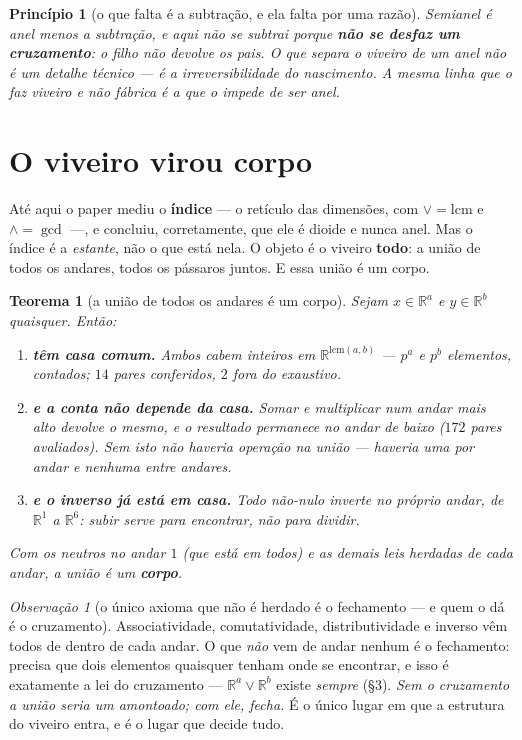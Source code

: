 \documentclass[11pt]{article}
\newcommand{\R}{\mathbb R}
\theoremstyle{plain}
\newtheorem{teorema}{Teorema}
\newtheorem{principio}{Princípio}
\theoremstyle{remark}
\newtheorem{obs}{Observação}
\begin{document}
\begin{principio}[o que falta é a subtração, e ela falta por uma razão]
Semianel é anel menos a subtração, e aqui não se subtrai porque \textbf{não se desfaz um
cruzamento}: o filho não devolve os pais. O que separa o viveiro de um anel não é um detalhe técnico
--- é a irreversibilidade do nascimento. A mesma linha que o faz viveiro e não fábrica é a que o
impede de ser anel.
\end{principio}

\section{O viveiro virou corpo}

Até aqui o paper mediu o \textbf{índice} --- o retículo das dimensões, com $\vee=\mathrm{lcm}$ e
$\wedge=\gcd$ ---, e concluiu, corretamente, que ele é dioide e nunca anel. Mas o índice é a
\emph{estante}, não o que está nela. O objeto é o viveiro \textbf{todo}: a união de todos os
andares, todos os pássaros juntos. E essa união é um corpo.

\begin{teorema}[a união de todos os andares é um corpo]
Sejam $x\in\R^a$ e $y\in\R^b$ quaisquer. Então:
\begin{enumerate}\itemsep2pt
\item \textbf{têm casa comum.} Ambos cabem inteiros em $\R^{\mathrm{lcm}(a,b)}$ --- $p^a$ e $p^b$
elementos, contados; $14$ pares conferidos, $2$ fora do exaustivo.
\item \textbf{e a conta não depende da casa.} Somar e multiplicar num andar mais alto devolve o
mesmo, e o resultado permanece no andar de baixo ($172$ pares avaliados). Sem isto não haveria
operação \emph{na união} --- haveria uma por andar e nenhuma entre andares.
\item \textbf{e o inverso já está em casa.} Todo não-nulo inverte no próprio andar, de $\R^1$ a
$\R^6$: subir serve para \emph{encontrar}, não para dividir.
\end{enumerate}
Com os neutros no andar $1$ (que está em todos) e as demais leis herdadas de cada andar, a união é
um \textbf{corpo}.
\end{teorema}

\begin{obs}[o único axioma que não é herdado é o fechamento --- e quem o dá é o cruzamento]
Associatividade, comutatividade, distributividade e inverso vêm todos de dentro de cada andar. O que
\emph{não} vem de andar nenhum é o fechamento: precisa que dois elementos quaisquer tenham onde se
encontrar, e isso é exatamente a lei do cruzamento --- $\R^a\vee\R^b$ existe \emph{sempre}
(\S3). \emph{Sem o cruzamento a união seria um amontoado; com ele, fecha.} É o único lugar em que a
estrutura do viveiro entra, e é o lugar que decide tudo.
\end{obs}
\end{document}
